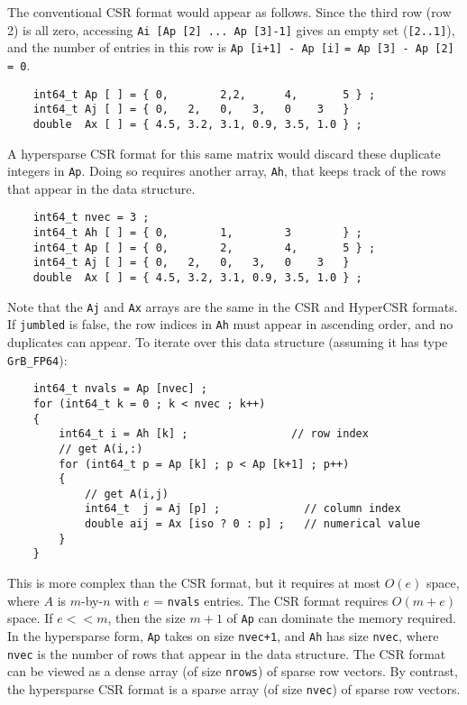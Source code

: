 The conventional CSR format would appear as follows.  Since the third row (row
2) is all zero, accessing \verb'Ai [Ap [2] ... Ap [3]-1]' gives an empty set
(\verb'[2..1]'), and the number of entries in this row is
\verb'Ap [i+1] - Ap [i]' \verb'= Ap [3] - Ap [2] = 0'.

{\footnotesize
\begin{verbatim}
    int64_t Ap [ ] = { 0,        2,2,      4,       5 } ;
    int64_t Aj [ ] = { 0,   2,   0,   3,   0    3   }
    double  Ax [ ] = { 4.5, 3.2, 3.1, 0.9, 3.5, 1.0 } ; \end{verbatim} }

A hypersparse CSR format for this same matrix would discard
these duplicate integers in \verb'Ap'.  Doing so requires
another array, \verb'Ah', that keeps track of the rows that appear
in the data structure.

{\footnotesize
\begin{verbatim}
    int64_t nvec = 3 ;
    int64_t Ah [ ] = { 0,        1,        3        } ;
    int64_t Ap [ ] = { 0,        2,        4,       5 } ;
    int64_t Aj [ ] = { 0,   2,   0,   3,   0    3   }
    double  Ax [ ] = { 4.5, 3.2, 3.1, 0.9, 3.5, 1.0 } ; \end{verbatim} }

Note that the \verb'Aj' and \verb'Ax' arrays are the same in the CSR and
HyperCSR formats.  If \verb'jumbled' is false, the row indices in \verb'Ah'
must appear in ascending order, and no duplicates can appear.  To iterate over
this data structure (assuming it has type \verb'GrB_FP64'):

    {\footnotesize
    \begin{verbatim}
    int64_t nvals = Ap [nvec] ;
    for (int64_t k = 0 ; k < nvec ; k++)
    {
        int64_t i = Ah [k] ;                // row index
        // get A(i,:)
        for (int64_t p = Ap [k] ; p < Ap [k+1] ; p++)
        {
            // get A(i,j)
            int64_t  j = Aj [p] ;             // column index
            double aij = Ax [iso ? 0 : p] ;   // numerical value
        }
    } \end{verbatim}}

\vspace{-0.05in}
This is more complex than the CSR format, but it requires at most
$O(e)$ space, where $A$ is $m$-by-$n$ with $e$ = \verb'nvals' entries.  The
CSR format requires $O(m+e)$ space.  If $e << m$, then the size $m+1$
of \verb'Ap' can dominate the memory required.  In the hypersparse form,
\verb'Ap' takes on size \verb'nvec+1', and \verb'Ah' has size \verb'nvec',
where \verb'nvec' is the number of rows that appear in the data structure.
The CSR format can be viewed as a dense array (of size \verb'nrows')
of sparse row vectors.   By contrast, the hypersparse CSR format is a sparse
array (of size \verb'nvec') of sparse row vectors.

